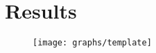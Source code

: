 \section{Results}
\label{results}
\begin{figure}[htbp]
   \texttt{[image: graphs/template]}
   \label{fig:template}
\end{figure}

